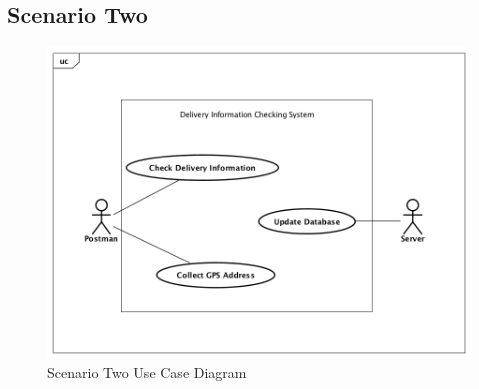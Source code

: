 \documentclass[12pt]{scrreprt}
\begin{document}
\subsection{Scenario Two}
\begin{figure}[H]
  \centering\includegraphics[width=5in]{DocumentRes/2UseCaseDiagram.png}
  \caption{Scenario Two Use Case Diagram}
\end{figure}
\end{document}
